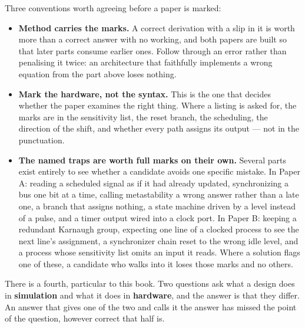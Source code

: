 Three conventions worth agreeing before a paper is marked:
\begin{itemize}
  \item \textbf{Method carries the marks.} A correct derivation with a slip in it is worth more than
    a correct answer with no working, and both papers are built so that later parts consume earlier
    ones. Follow through an error rather than penalising it twice: an architecture that faithfully
    implements a wrong equation from the part above loses nothing.
  \item \textbf{Mark the hardware, not the syntax.} This is the one that decides whether the paper
    examines the right thing. Where a listing is asked for, the marks are in the sensitivity list,
    the reset branch, the scheduling, the direction of the shift, and whether every path assigns
    its output --- not in the punctuation.
  \item \textbf{The named traps are worth full marks on their own.} Several parts exist entirely to
    see whether a candidate avoids one specific mistake. In Paper A: reading a scheduled signal as
    if it had already updated, synchronizing a bus one bit at a time, calling metastability a wrong
    answer rather than a late one, a  branch that assigns nothing, a state machine driven
    by a level instead of a pulse, and a timer output wired into a clock port. In Paper B: keeping a
    redundant Karnaugh group, expecting one line of a clocked process to see the next line's
    assignment, a synchronizer chain reset to the wrong idle level, and a process whose sensitivity
    list omits an input it reads. Where a solution flags one of these, a candidate who walks into it
    loses those marks and no others.
\end{itemize}

There is a fourth, particular to this book. Two questions ask what a design does in
\textbf{simulation} and what it does in \textbf{hardware}, and the answer is that they differ. An
answer that gives one of the two and calls it the answer has missed the point of the question,
however correct that half is.
